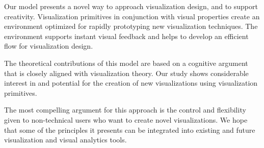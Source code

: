 \label{conclusion}

Our model presents a novel way to approach visualization design, and to support creativity.
Visualization primitives in conjunction with visual properties create an environment optimized for rapidly prototyping new visualization techniques.
The environment supports instant visual feedback and helps to develop an efficient flow for visualization design.

The theoretical contributions of this model are based on a cognitive argument that is closely aligned with visualization theory.
Our study shows considerable interest in and potential for the creation of new visualizations using visualization primitives.

The most compelling argument for this approach is the control and flexibility given to non-technical users who want to create novel visualizations.
We hope that some of the principles it presents can be integrated into existing and future visualization and visual analytics tools.